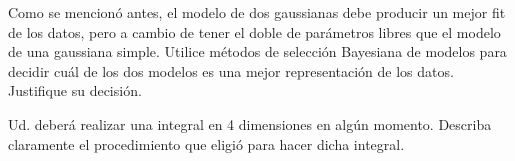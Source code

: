 \documentclass[letter, 11pt]{article}
\begin{document}
\vspace{1em}

Como se mencionó antes, el modelo de dos gaussianas debe producir un mejor fit
de los datos, pero a cambio de tener el doble de parámetros libres que el
modelo de una gaussiana simple. Utilice métodos de selección Bayesiana de
modelos para decidir cuál de los dos modelos es una mejor representación de los
datos.  Justifique su decisión.

\begin{ayuda}
  \small

  Ud. deberá realizar una integral en 4 dimensiones en algún momento.  Describa
  claramente el procedimiento que eligió para hacer dicha integral.

\end{ayuda}
\end{document}

